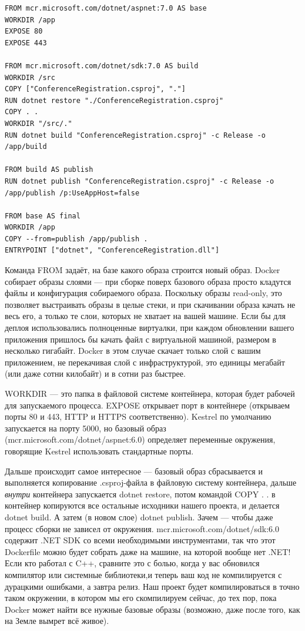 \documentclass{../../text-style}
\begin{document}
\begin{verbatim}
FROM mcr.microsoft.com/dotnet/aspnet:7.0 AS base
WORKDIR /app
EXPOSE 80
EXPOSE 443

FROM mcr.microsoft.com/dotnet/sdk:7.0 AS build
WORKDIR /src
COPY ["ConferenceRegistration.csproj", "."]
RUN dotnet restore "./ConferenceRegistration.csproj"
COPY . .
WORKDIR "/src/."
RUN dotnet build "ConferenceRegistration.csproj" -c Release -o /app/build

FROM build AS publish
RUN dotnet publish "ConferenceRegistration.csproj" -c Release -o /app/publish /p:UseAppHost=false

FROM base AS final
WORKDIR /app
COPY --from=publish /app/publish .
ENTRYPOINT ["dotnet", "ConferenceRegistration.dll"]
\end{verbatim}

Команда FROM задаёт, на базе какого образа строится новый образ. Docker собирает образы слоями --- при сборке поверх базового образа просто кладутся файлы и конфигурация собираемого образа. Поскольку образы read-only, это позволяет выстраивать образы в целые стеки, и при скачивании образа качать не весь его, а только те слои, которых не хватает на вашей машине. Если бы для деплоя использовались полноценные виртуалки, при каждом обновлении вашего приложения пришлось бы качать файл с виртуальной машиной, размером в несколько гигабайт. Docker в этом случае скачает только слой с вашим приложением, не перекачивая слой с инфраструктурой, это единицы мегабайт (или даже сотни килобайт) и в сотни раз быстрее.

WORKDIR --- это папка в файловой системе контейнера, которая будет рабочей для запускаемого процесса. EXPOSE открывает порт в контейнере (открываем порты 80 и 443, HTTP и HTTPS соответственно). Kestrel по умолчанию запускается на порту 5000, но базовый образ (mcr.microsoft.com/dotnet/aspnet:6.0) определяет переменные окружения, говорящие Kestrel использовать стандартные порты.

Дальше происходит самое интересное --- базовый образ сбрасывается и выполняется копирование .csproj-файла в файловую систему контейнера, дальше \emph{внутри} контейнера запускается dotnet restore, потом командой COPY . . в контейнер копируются все остальные исходники нашего проекта, и делается dotnet build. А затем (в новом слое) dotnet publish. Зачем --- чтобы даже процесс сборки не зависел от окружения. mcr.microsoft.com/dotnet/sdk:6.0 содержит .NET SDK со всеми необходимыми инструментами, так что этот Dockerfile можно будет собрать даже на машине, на которой вообще нет .NET! Если кто работал с C++, сравните это с болью, когда у вас обновился компилятор или системные библиотеки,и теперь ваш код не компилируется с дурацкими ошибками, а завтра релиз. Наш проект будет компилироваться в точно таком окружении, в котором мы его скомпилируем сейчас, до тех пор, пока Docker может найти все нужные базовые образы (возможно, даже после того, как на Земле вымрет всё живое).
\end{document}

